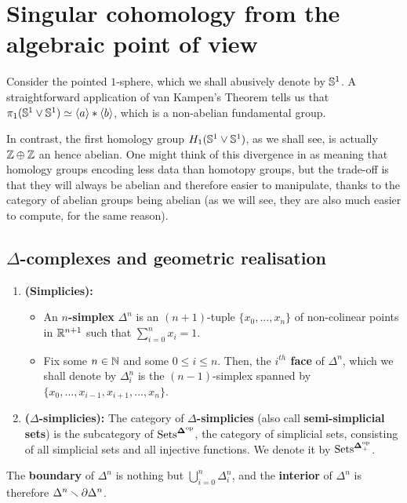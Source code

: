     \section{Singular cohomology from the algebraic point of view}
        \begin{example} \label{example: non_abelian_fundamental_group}
            Consider the pointed $1$-sphere, which we shall abusively denote by $\mathbb{S}^1$. A straightforward application of van Kampen's Theorem tells us that $\pi_1(\mathbb{S}^1 \vee \mathbb{S}^1) \simeq \langle a\rangle * \langle b\rangle$, which is a non-abelian fundamental group.
    	\end{example}
    	
    	In contrast, the first homology group $H_1(\mathbb{S}^1 \vee \mathbb{S}^1)$, as we shall see, is actually $\mathbb{Z} \oplus \mathbb{Z}$ an hence abelian. One might think of this divergence in  as meaning that homology groups encoding less data than homotopy groups, but the trade-off is that they will always be abelian and therefore easier to manipulate, thanks to the category of abelian groups being abelian (as we will see, they are also much easier to compute, for the same reason).
    	
    	\subsection{\texorpdfstring{$\Delta$}{}-complexes and geometric realisation}
    	    \begin{definition} \label{def: delta_simplicies}
                
                \begin{enumerate}
                    \item \textbf{(Simplicies):} 
                        \begin{itemize}
                            \item An \textbf{$n$-simplex} $\Delta^n$ is an $(n + 1)$-tuple $\{x_0, ..., x_n\}$ of non-colinear points in $\mathbb{R}^{n + 1}$ such that $\sum_{i = 0}^n x_i = 1$.
                            \item Fix some $n \in \mathbb{N}$ and some $0 \leq i \leq n$. Then, the \textbf{$i^{th}$ face} of $\Delta^n$, which we shall denote by $\Delta^n_i$ is the $(n - 1)$-simplex spanned by $\{x_0, ..., x_{i - 1}, x_{i + 1}, ..., x_n\}$. 
                        \end{itemize}
                    \item \textbf{($\Delta$-simplicies):} The category of \textbf{$\Delta$-simplicies} (also call \textbf{semi-simplicial sets}) is the subcategory of $\mathrm{Sets}^{\mathbf{\Delta}^{\mathrm{op}}}$, the category of simplicial sets, consisting of all simplicial sets and all injective functions. We denote it by $\mathrm{Sets}^{\mathbf{\Delta}_+^{\mathrm{op}}}$.
                \end{enumerate}
    	    \end{definition}
    	    \begin{remark}
                The \textbf{boundary} of $\Delta^n$ is nothing but $\bigcup_{i = 0}^n \Delta^n_i$, and the \textbf{interior} of $\Delta^n$ is therefore $\Delta^n \smallsetminus \partial\Delta^n$.
    	    \end{remark}
    	    

